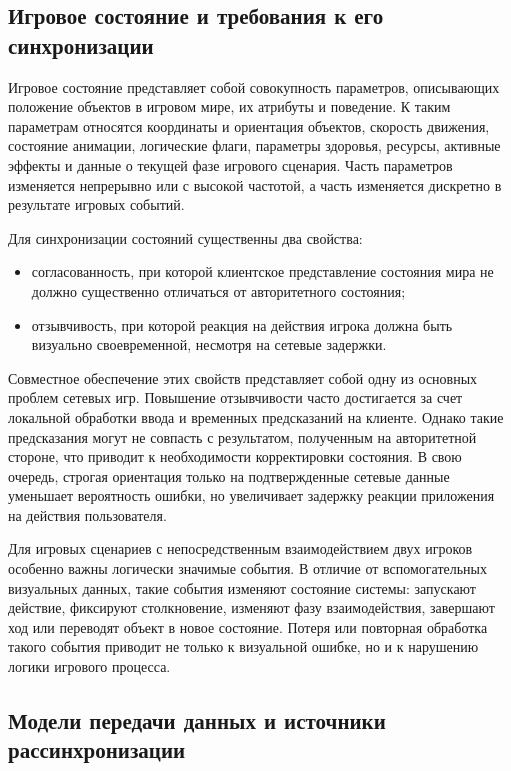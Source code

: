 \subsection{Игровое состояние и требования к его синхронизации}

Игровое состояние представляет собой совокупность параметров, описывающих положение объектов в игровом мире, их атрибуты и поведение. К таким параметрам относятся координаты и ориентация объектов, скорость движения, состояние анимации, логические флаги, параметры здоровья, ресурсы, активные эффекты и данные о текущей фазе игрового сценария. Часть параметров изменяется непрерывно или с высокой частотой, а часть изменяется дискретно в результате игровых событий.

Для синхронизации состояний существенны два свойства:
\begin{itemize}
	\item согласованность, при которой клиентское представление состояния мира не должно существенно отличаться от авторитетного состояния;
	\item отзывчивость, при которой реакция на действия игрока должна быть визуально своевременной, несмотря на сетевые задержки.
\end{itemize}

Совместное обеспечение этих свойств представляет собой одну из основных проблем сетевых игр. Повышение отзывчивости часто достигается за счет локальной обработки ввода и временных предсказаний на клиенте. Однако такие предсказания могут не совпасть с результатом, полученным на авторитетной стороне, что приводит к необходимости корректировки состояния. В свою очередь, строгая ориентация только на подтвержденные сетевые данные уменьшает вероятность ошибки, но увеличивает задержку реакции приложения на действия пользователя.

Для игровых сценариев с непосредственным взаимодействием двух игроков особенно важны логически значимые события. В отличие от вспомогательных визуальных данных, такие события изменяют состояние системы: запускают действие, фиксируют столкновение, изменяют фазу взаимодействия, завершают ход или переводят объект в новое состояние. Потеря или повторная обработка такого события приводит не только к визуальной ошибке, но и к нарушению логики игрового процесса.

\subsection{Модели передачи данных и источники рассинхронизации}

